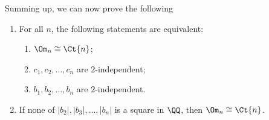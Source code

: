 Summing up, we can now prove the following

\begin{theorem}[Section 1]
  \label{thm:section1}
  \leanok
  \begin{enumerate}
    \item For all $n$, the following statements are equivalent:
      \begin{enumerate}
        \item[a)] $\Om_n \cong \Ct{n}$;
        \item[b)] $c_1, c_2, \dots, c_n$ are $2$-independent;
        \item[c)] $b_1, b_2, \dots, b_n$ are $2$-independent.
      \end{enumerate}
    \item If none of $|b_2|, |b_3|, \dots, |b_n|$ is a square in $\QQ$, then $\Om_n \cong \Ct{n}$.
  \end{enumerate}
\end{theorem}

